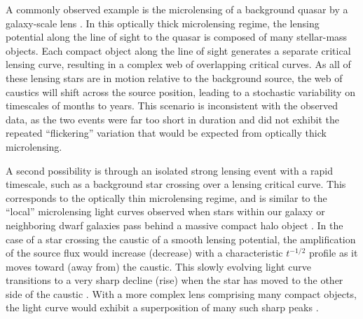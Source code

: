 A commonly observed example is the microlensing of a background quasar
by a galaxy-scale lens \citep{Wambsganss:2001, Kochanek:2004}.  In
this optically thick microlensing regime, the lensing potential along
the line of sight to the quasar is composed of many stellar-mass
objects.  Each compact object along the line of sight generates a
separate critical lensing curve, resulting in a complex web of
overlapping critical curves. As all of these lensing stars are in
motion relative to the background source, the web of caustics will
shift across the source position, leading to a stochastic variability
on timescales of months to years.  This scenario is inconsistent with
the observed data, as the two \spock events were far too short in
duration and did not exhibit the repeated ``flickering'' variation
that would be expected from optically thick microlensing.

A second possibility is through an isolated strong lensing event with
a rapid timescale, such as a background star crossing over a lensing
critical curve.  This corresponds to the optically thin microlensing
regime, and is similar to the ``local'' microlensing light curves
observed when stars within our galaxy or neighboring dwarf galaxies
pass behind a massive compact halo object \citep{Paczynski:1986,
  Alcock:1993, Aubourg:1993, Udalski:1993}.  In the case of a star
crossing the caustic of a smooth lensing potential, the amplification
of the source flux would increase (decrease) with a characteristic
$t^{-1/2}$ profile as it moves toward (away from) the caustic. This
slowly evolving light curve transitions to a very sharp decline (rise)
when the star has moved to the other side of the caustic
\citep{Schneider:1986,MiraldaEscude:1991}.  With a more complex lens
comprising many compact objects, the light curve would exhibit a
superposition of many such sharp peaks \citep{Lewis:1993}.

